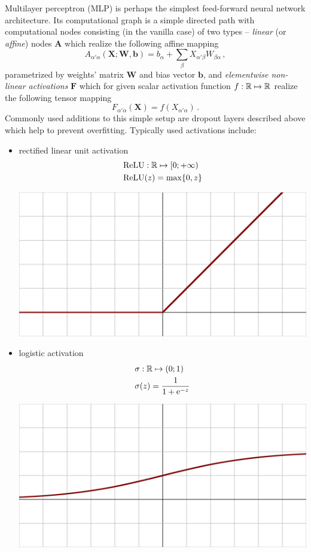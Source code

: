\documentclass{myclass}
\begin{document}
Multilayer perceptron (MLP) is perhaps the simplest feed-forward neural network architecture. Its
computational graph is a simple directed path with computational nodes consisting (in the vanilla
case) of two types -- \emph{linear} (or \emph{affine}) nodes $\bm{A}$ which realize the following
affine mapping
\[
   A_{\alpha'\alpha}(\bm{X}; \bm{W}, \bm{b}) = b_\alpha + \sum_\beta X_{\alpha'\beta} W_{\beta\alpha}\,,
\]
parametrized by weights' matrix $\bm{W}$ and bias vector $\bm{b}$, and \emph{elementwise non-linear
activations} $\bm{F}$ which for given scalar activation function $f: \mathbb{R} \mapsto \mathbb{R}$ realize the
following tensor mapping
\[
   F_{\alpha'\alpha}(\bm{X}) = f(X_{\alpha'\alpha})\,.
\]
Commonly used additions to this simple setup are dropout layers described above which help to
prevent overfitting. Typically used activations include:
\begin{itemize}
   \item rectified linear unit activation
   \[
   \begin{split}
      &\text{ReLU}: \mathbb{R} \mapsto [0; +\infty)\\
      &\text{ReLU}(z) = \max\{0,z\}\\
   \end{split}
   \]
   \begin{center}
   \includegraphics[width=0.5\columnwidth]{figs/Activation_rectified_linear.svg.png}
   \end{center}
   
   \item logistic activation
   \[
   \begin{split}
      &\sigma: \mathbb{R} \mapsto (0;1)\\
      &\sigma(z) = \frac{1}{1 + \mathrm{e}^{-z}}
   \end{split}
   \]
   \begin{center}
   \includegraphics[width=0.5\columnwidth]{figs/Activation_logistic.svg.png}
   \end{center}


\end{itemize}
\end{document}
